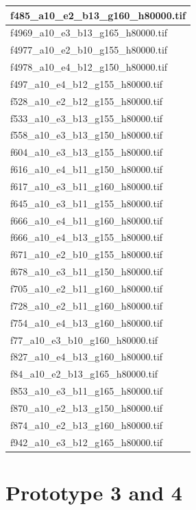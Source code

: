 \documentclass[12pt, twoside]{article}
\begin{document}
\begin{appendices}
\begin{longtable}{|l|}
		f485\_a10\_e2\_b13\_g160\_h80000.tif \\ \hline 
		f4969\_a10\_e3\_b13\_g165\_h80000.tif \\ \hline 
		f4977\_a10\_e2\_b10\_g155\_h80000.tif \\ \hline 
		f4978\_a10\_e4\_b12\_g150\_h80000.tif \\ \hline 
		f497\_a10\_e4\_b12\_g155\_h80000.tif \\ \hline 
		f528\_a10\_e2\_b12\_g155\_h80000.tif \\ \hline 
		f533\_a10\_e3\_b13\_g155\_h80000.tif \\ \hline 
		f558\_a10\_e3\_b13\_g150\_h80000.tif \\ \hline 
		f604\_a10\_e3\_b13\_g155\_h80000.tif \\ \hline 
		f616\_a10\_e4\_b11\_g150\_h80000.tif \\ \hline 
		f617\_a10\_e3\_b11\_g160\_h80000.tif \\ \hline 
		f645\_a10\_e3\_b11\_g155\_h80000.tif \\ \hline 
		f666\_a10\_e4\_b11\_g160\_h80000.tif \\ \hline 
		f666\_a10\_e4\_b13\_g155\_h80000.tif \\ \hline 
		f671\_a10\_e2\_b10\_g155\_h80000.tif \\ \hline 
		f678\_a10\_e3\_b11\_g150\_h80000.tif \\ \hline 
		f705\_a10\_e2\_b11\_g160\_h80000.tif \\ \hline 
		f728\_a10\_e2\_b11\_g160\_h80000.tif \\ \hline 
		f754\_a10\_e4\_b13\_g160\_h80000.tif \\ \hline 
		f77\_a10\_e3\_b10\_g160\_h80000.tif \\ \hline 
		f827\_a10\_e4\_b13\_g160\_h80000.tif \\ \hline 
		f84\_a10\_e2\_b13\_g165\_h80000.tif \\ \hline 
		f853\_a10\_e3\_b11\_g165\_h80000.tif \\ \hline 
		f870\_a10\_e2\_b13\_g150\_h80000.tif \\ \hline 
		f874\_a10\_e2\_b13\_g160\_h80000.tif \\ \hline 
		f942\_a10\_e3\_b12\_g165\_h80000.tif \\ \hline 
	\end{longtable}
	
	\section{Prototype 3 and 4}

\end{appendices}
\end{document}
